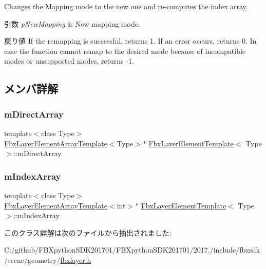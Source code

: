 Changes the Mapping mode to the new one and re-\/computes the index array. 
\begin{DoxyParams}{引数}
{\em p\+New\+Mapping} & New mapping mode. \\
\hline
\end{DoxyParams}
\begin{DoxyReturn}{戻り値}
If the remapping is successful, returns 1. If an error occurs, returns 0. In case the function cannot remap to the desired mode because of incompatible modes or unsupported modes, returns -\/1. 
\end{DoxyReturn}


\subsection{メンバ詳解}
\mbox{\label{class_fbx_layer_element_template_a0c7242aa361d91031b5137fbece371f3}} 
\subsubsection{\texorpdfstring{m\+Direct\+Array}{mDirectArray}}
{\footnotesize\ttfamily template$<$class Type$>$ \\
\hyperlink{class_fbx_layer_element_array_template}{Fbx\+Layer\+Element\+Array\+Template}$<$Type$>$$\ast$ \hyperlink{class_fbx_layer_element_template}{Fbx\+Layer\+Element\+Template}$<$ Type $>$\+::m\+Direct\+Array}

\mbox{\label{class_fbx_layer_element_template_a4aa88a6936b2ab08e150ff6336a91a7d}} 
\subsubsection{\texorpdfstring{m\+Index\+Array}{mIndexArray}}
{\footnotesize\ttfamily template$<$class Type$>$ \\
\hyperlink{class_fbx_layer_element_array_template}{Fbx\+Layer\+Element\+Array\+Template}$<$int$>$$\ast$ \hyperlink{class_fbx_layer_element_template}{Fbx\+Layer\+Element\+Template}$<$ Type $>$\+::m\+Index\+Array}



このクラス詳解は次のファイルから抽出されました\+:\begin{DoxyCompactItemize}
\item 
C\+:/github/\+F\+B\+Xpython\+S\+D\+K201701/\+F\+B\+Xpython\+S\+D\+K201701/2017./include/fbxsdk/scene/geometry/\hyperlink{fbxlayer_8h}{fbxlayer.\+h}\end{DoxyCompactItemize}
